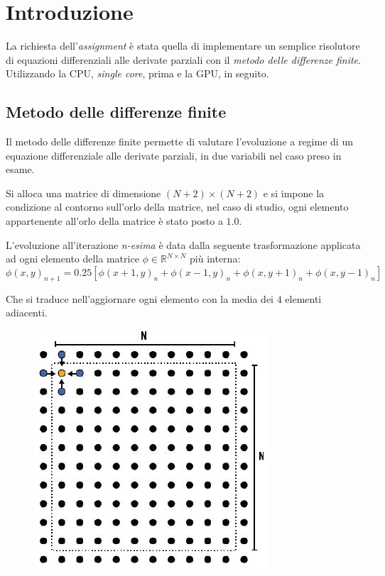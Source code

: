 \documentclass[12pt]{article}
\begin{document}
\maketitle
\newpage

\section{Introduzione}
La richiesta dell'\emph{assignment} è stata quella di implementare un semplice risolutore di equazioni differenziali alle derivate parziali con il \emph{metodo delle differenze finite}. Utilizzando la CPU, \emph{single core}, prima e la GPU, in seguito.

\subsection{Metodo delle differenze finite}
Il metodo delle differenze finite permette di valutare l'evoluzione a regime di un equazione differenziale alle derivate parziali, in due variabili nel caso preso in esame.

Si alloca una matrice di dimensione $(N+2) \times (N+2)$ e si impone la condizione al contorno sull'orlo della matrice, nel caso di studio, ogni elemento appartenente all'orlo della matrice è stato posto a $1.0$.

L'evoluzione all'iterazione \emph{n-esima} è data dalla seguente trasformazione applicata 
ad ogni elemento della matrice $ \phi \in \mathbb{R}^{N \times N}$ più interna:
$$ \phi(x,y)_{n+1} = 0.25\left[ \phi(x+1,y)_n +\phi(x-1,y)_n +\phi(x,y+1)_n +\phi(x,y-1)_n  \right] $$

Che si traduce nell'aggiornare ogni elemento con la media dei $4$ elementi adiacenti.

\begin{figure}[H]
\includegraphics{PDE_normal.jpg}
\centering
\end{figure}
\end{document}
